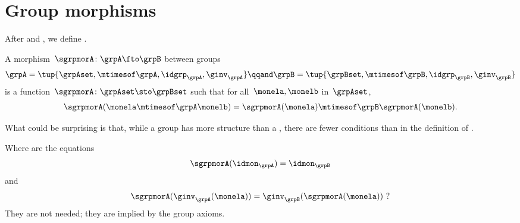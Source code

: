 \section{Group morphisms}

After  and , we define .


\begin{ctdefinition}
    \label{def:group-mor}
    A morphism~$\sgrpmorA\colon \grpA \fto \grpB$ between groups
    \begin{equation}
        \grpA = \tup{\grpAset, {{\mtimesof\grpA}}, \idgrp_\grpA, \ginv_\grpA}
        \qqand
        \grpB = \tup{\grpBset, {{\mtimesof\grpB}}, \idgrp_\grpB, \ginv_\grpB}
    \end{equation}
    is a function~$\sgrpmorA \colon \grpAset \sto \grpBset$ such that for all~$\monela, \monelb$ in~$\grpAset$,
    \begin{equation}
        \label{eq:group-mor-comp}
        \sgrpmorA (\monela \mtimesof\grpA \monelb) = \sgrpmorA (\monela) \mtimesof\grpB \sgrpmorA(\monelb).
    \end{equation}
\end{ctdefinition}

What could be surprising is that, while a group has more structure than a , there are fewer conditions than in the definition of .

Where are the equations
\begin{equation}
    \label{eq:grp-id-comp}
    \sgrpmorA (\idmon_\grpA) = \idmon_{\grpB}
\end{equation}
and
\begin{equation}
    \label{eq:grp-inv-comp}
    \sgrpmorA (\ginv_\grpA(\monela)) = \ginv_\grpB(\sgrpmorA(\monela)) \ ?
\end{equation}
%
They are not needed; they are implied by the group axioms.

